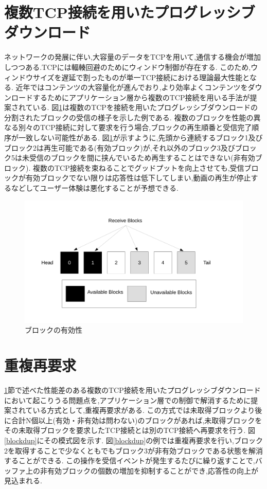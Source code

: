 \documentclass[a4j,12pt]{gradthesis_utf8}
\begin{document}
\clearpage

\section{複数TCP接続を用いたプログレッシブダウンロード}
\label{hukusu}
ネットワークの発展に伴い,大容量のデータをTCPを用いて,通信する機会が増加しつつある.TCPには輻輳回避のためにウィンドウ制御が存在する.
このため,ウィンドウサイズを遅延で割ったものが単一TCP接続における理論最大性能となる.
近年ではコンテンツの大容量化が進んでおり,より効率よくコンテンツをダウンロードするためにアプリケーション層から複数のTCP接続を用いる手法が提案されている.
図\ref{block}は複数のTCPを接続を用いたプログレッシブダウンロードの分割されたブロックの受信の様子を示した例である.
複数のブロックを性能の異なる別々のTCP接続に対して要求を行う場合,ブロックの再生順番と受信完了順序が一致しない可能性がある.
図\ref{block}が示すように,先頭から連続するブロック1及びブロック2は再生可能である(有効ブロック)が,それ以外のブロック3及びブロック5は未受信のブロックを間に挟んでいるため再生することはできない(非有効ブロック).
複数のTCP接続を束ねることでグッドプットを向上させても,受信ブロックが有効ブロックでない限りは応答性は低下してしまい,動画の再生が停止するなどしてユーザー体験は悪化することが予想できる.
 
\begin{figure}[ht]
	\centering
	\includegraphics[width=18cm]{figure/block.pdf}
	\caption{ブロックの有効性}
	\label{block}
\end{figure}

 \section{重複再要求}
 \label{juhuku}
 \ref{hukusu}節で述べた性能差のある複数のTCP接続を用いたプログレッシブダウンロードにおいて起こりうる問題点を,アプリケーション層での制御で解消するために提案されている方式として,重複再要求がある.
 この方式では未取得ブロックより後に合計N個以上(有効・非有効は問わない)のブロックがあれば,未取得ブロックをその未取得ブロックを要求したTCP接続とは別のTCP接続へ再要求を行う.
 図\ref{blockdup}にその模式図を示す.
 図\ref{blockdup}の例では重複再要求を行い,ブロック2を取得することで少なくともでもブロック3が非有効ブロックである状態を解消することができる.
 この操作を受信イベントが発生するたびに繰り返すことで,バッファ上の非有効ブロックの個数の増加を抑制することができ,応答性の向上が見込まれる.
 
\end{document}
